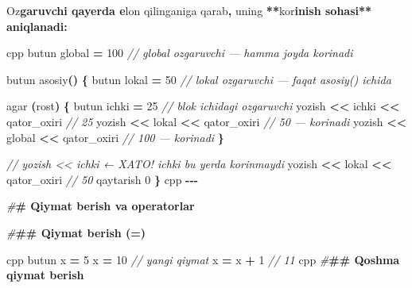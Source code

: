 \documentclass[a4paper,11pt,twoside,openright]{book}
\newenvironment{Shaded}{\begin{snugshade}}{\end{snugshade}}
\newcommand{\CharTok}[1]{\textcolor[rgb]{0.31,0.60,0.02}{#1}}
\newcommand{\CommentTok}[1]{\textcolor[rgb]{0.56,0.35,0.01}{\textit{#1}}}
\newcommand{\DecValTok}[1]{\textcolor[rgb]{0.00,0.00,0.81}{#1}}
\newcommand{\ErrorTok}[1]{\textcolor[rgb]{0.64,0.00,0.00}{\textbf{#1}}}
\newcommand{\NormalTok}[1]{#1}
\newcommand{\OperatorTok}[1]{\textcolor[rgb]{0.81,0.36,0.00}{\textbf{#1}}}
\newcommand{\PreprocessorTok}[1]{\textcolor[rgb]{0.56,0.35,0.01}{\textit{#1}}}
\begin{document}
\begin{Shaded}
\begin{Highlighting}[]
\NormalTok{O}\CharTok{\textquotesingle{}z}\ErrorTok{garuvchi qayerda e}\CharTok{\textquotesingle{}}\NormalTok{lon qilinganiga qarab}\OperatorTok{,}\NormalTok{ uning }\OperatorTok{**}\NormalTok{ko}\CharTok{\textquotesingle{}r}\ErrorTok{inish sohasi** aniqlanadi:}

\ErrorTok{\textasciigrave{}\textasciigrave{}\textasciigrave{}}\NormalTok{cpp}
\NormalTok{butun global }\OperatorTok{=} \DecValTok{100}    \CommentTok{// global o\textquotesingle{}zgaruvchi — hamma joyda ko\textquotesingle{}rinadi}

\NormalTok{butun asosiy}\OperatorTok{()} \OperatorTok{\{}
\NormalTok{    butun lokal }\OperatorTok{=} \DecValTok{50}   \CommentTok{// lokal o\textquotesingle{}zgaruvchi — faqat asosiy() ichida}

\NormalTok{    agar }\OperatorTok{(}\NormalTok{rost}\OperatorTok{)} \OperatorTok{\{}
\NormalTok{        butun ichki }\OperatorTok{=} \DecValTok{25}   \CommentTok{// blok ichidagi o\textquotesingle{}zgaruvchi}
\NormalTok{        yozish }\OperatorTok{\textless{}\textless{}}\NormalTok{ ichki }\OperatorTok{\textless{}\textless{}}\NormalTok{ qator\_oxiri   }\CommentTok{// 25}
\NormalTok{        yozish }\OperatorTok{\textless{}\textless{}}\NormalTok{ lokal }\OperatorTok{\textless{}\textless{}}\NormalTok{ qator\_oxiri   }\CommentTok{// 50 — ko\textquotesingle{}rinadi}
\NormalTok{        yozish }\OperatorTok{\textless{}\textless{}}\NormalTok{ global }\OperatorTok{\textless{}\textless{}}\NormalTok{ qator\_oxiri  }\CommentTok{// 100 — ko\textquotesingle{}rinadi}
    \OperatorTok{\}}

    \CommentTok{// yozish \textless{}\textless{} ichki  ← XATO! ichki bu yerda ko\textquotesingle{}rinmaydi}
\NormalTok{    yozish }\OperatorTok{\textless{}\textless{}}\NormalTok{ lokal }\OperatorTok{\textless{}\textless{}}\NormalTok{ qator\_oxiri    }\CommentTok{// 50}
\NormalTok{    qaytarish }\DecValTok{0}
\OperatorTok{\}}
\ErrorTok{\textasciigrave{}\textasciigrave{}\textasciigrave{}}\NormalTok{cpp}
\OperatorTok{{-}{-}{-}}

\PreprocessorTok{\#}\ErrorTok{\# Qiymat berish va operatorlar}

\PreprocessorTok{\#}\ErrorTok{\#\# Qiymat berish (=)}

\ErrorTok{\textasciigrave{}\textasciigrave{}\textasciigrave{}}\NormalTok{cpp}
\NormalTok{butun x }\OperatorTok{=} \DecValTok{5}
\NormalTok{x }\OperatorTok{=} \DecValTok{10}              \CommentTok{// yangi qiymat}
\NormalTok{x }\OperatorTok{=}\NormalTok{ x }\OperatorTok{+} \DecValTok{1}           \CommentTok{// 11}
\ErrorTok{\textasciigrave{}\textasciigrave{}\textasciigrave{}}\NormalTok{cpp}
\PreprocessorTok{\#}\ErrorTok{\#\# Qo\textquotesingle{}shma qiymat berish}


\end{Highlighting}
\end{Shaded}
\end{document}
